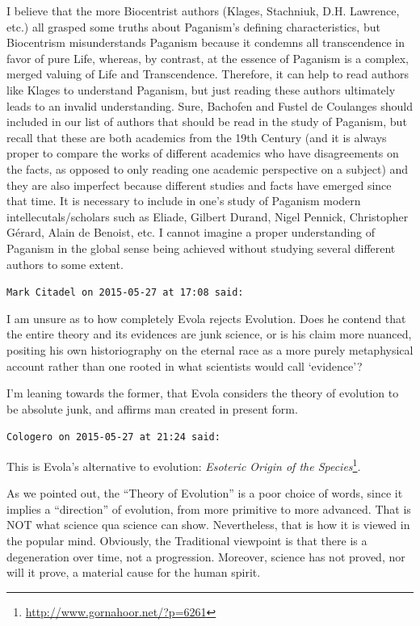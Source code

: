 \begin{footnotesize}
\begin{sffamily}
I believe that the more Biocentrist authors (Klages, Stachniuk, D.H. Lawrence, etc.) all grasped some truths about Paganism's defining characteristics, but Biocentrism misunderstands Paganism because it condemns all transcendence in favor of pure Life, whereas, by contrast, at the essence of Paganism is a complex, merged valuing of Life and Transcendence. Therefore, it can help to read authors like Klages to understand Paganism, but just reading these authors ultimately leads to an invalid understanding. Sure, Bachofen and Fustel de Coulanges should included in our list of authors that should be read in the study of Paganism, but recall that these are both academics from the 19th Century (and it is always proper to compare the works of different academics who have disagreements on the facts, as opposed to only reading one academic perspective on a subject) and they are also imperfect because different studies and facts have emerged since that time. It is necessary to include in one's study of Paganism modern intellecutals/scholars such as Eliade, Gilbert Durand, Nigel Pennick, Christopher Gérard, Alain de Benoist, etc. I cannot imagine a proper understanding of Paganism in the global sense being achieved without studying several different authors to some extent.

\hfill

\texttt{Mark Citadel on 2015-05-27 at 17:08 said:}

I am unsure as to how completely Evola rejects Evolution. Does he contend that the entire theory and its evidences are junk science, or is his claim more nuanced, positing his own historiography on the eternal race as a more purely metaphysical account rather than one rooted in what scientists would call `evidence'?

I'm leaning towards the former, that Evola considers the theory of evolution to be absolute junk, and affirms man created in present form.

\hfill

\texttt{Cologero on 2015-05-27 at 21:24 said:}

This is Evola's alternative to evolution: \textit{Esoteric Origin of the Species}\footnote{\url{http://www.gornahoor.net/?p=6261}}.


As we pointed out, the ``Theory of Evolution'' is a poor choice of words, since it implies a ``direction'' of evolution, from more primitive to more advanced. That is NOT what science qua science can show. Nevertheless, that is how it is viewed in the popular mind. Obviously, the Traditional viewpoint is that there is a degeneration over time, not a progression. Moreover, science has not proved, nor will it prove, a material cause for the human spirit.


\end{sffamily}
\end{footnotesize}
